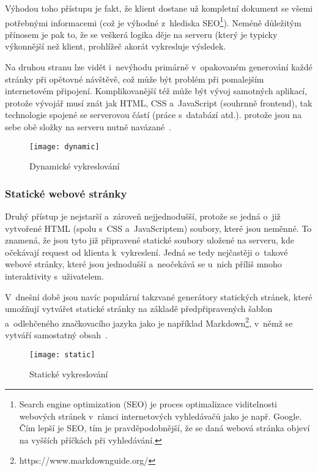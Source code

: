 Výhodou toho přístupu je fakt, že klient dostane už kompletní dokument se všemi potřebnými informacemi (což je výhodné z~hlediska SEO\footnote{Search engine optimization (SEO) je proces optimalizace viditelnosti webových stránek v~rámci internetových vyhledávačů jako je např. Google. Čím lepší je SEO, tím je pravděpodobnější, že se daná webová stránka objeví na vyšších příčkách při vyhledávání.}). Neméně důležitým přínosem je pak to, že se veškerá logika děje na serveru (který je typicky výkonnější než klient, prohlížeč akorát vykresluje výsledek.

Na druhou stranu lze vidět i~nevýhodu primárně v~opakovaném generování každé stránky při opětovné návštěvě, což může být problém při pomalejším internetovém připojení. Komplikovanější též může být vývoj samotných aplikací, protože vývojář musí znát jak HTML, CSS a~JavaScript (souhrnně frontend), tak technologie spojené se serverovou částí (práce s~databází atd.). protože jsou na sebe obě složky na serveru nutně navázané~\parencite{spa}.

\begin{figure}[ht]   
    \centering
    \texttt{[image: dynamic]}  
    \caption{Dynamické vykreslování}
    \label{dynamic}
 \end{figure}

\hypertarget{statickuxe9-webovuxe9-struxe1nky}{%
\subsubsection{Statické webové stránky}\label{statickuxe9-webovuxe9-struxe1nky}}

Druhý přístup je nejstarší a~zároveň nejjednodušší, protože se jedná o~již vytvořené HTML (spolu s~CSS a~JavaScriptem) soubory, které jsou neměnné. To znamená, že jsou tyto již připravené statické soubory uložené na serveru, kde očekávají request od klienta k~vykreslení. Jedná se tedy nejčastěji o~takové webové stránky, které jsou jednodušší a~neočekává se u~nich příliš mnoho interaktivity s~uživatelem.

V~dnešní době jsou navíc populární takzvané generátory statických stránek, které umožňují vytvářet statické stránky na základě předpřipravených šablon a~odlehčeného značkovacího jazyka jako je například Markdown\footnote{https://www.markdownguide.org/}, v~němž se vytváří samostatný obsah~\parencite{spa}.

\begin{figure}[ht]   
    \centering
    \texttt{[image: static]}  
    \caption{Statické vykreslování}
    \label{static}
 \end{figure}


